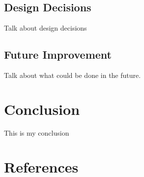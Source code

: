 \documentclass[titlesmallcaps, examinerscopy, copyrightpage]{uqthesis}
\begin{document}
\section{Design Decisions}
\label{ch:review:design}

Talk about design decisions

\section{Future Improvement}

Talk about what could be done in the future.

\chapter{Conclusion}

 This is my conclusion




























\chapter*{References}
\begingroup
{}
\renewcommand{\addcontentsline}[3]{}
\renewcommand{\chapter}[2]{}

\endgroup


\end{document}
